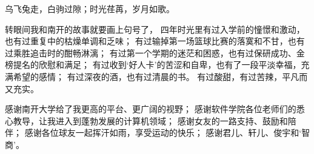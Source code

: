 
\begin{zhixie}
乌飞兔走，白驹过隙；时光荏苒，岁月如歌。

转眼间我和南开的故事就要画上句号了，
四年时光里有过入学前的憧憬和激动，也有过重复中的枯燥单调和乏味；
有过输掉第一场篮球比赛的落寞和不甘，也有过乘胜追击时的酣畅淋漓；
有过第一个学期的迷茫和困惑，也有过保研成功、金榜提名的欣慰和满足；
有过收到‘好人卡’的苦涩和自卑，也有了一段平淡幸福，充满希望的感情；
有过深夜的酒，也有过清晨的书。
有过酸甜，有过苦辣，平凡而又充实。

感谢南开大学给了我更高的平台、更广阔的视野；
感谢软件学院各位老师们的悉心教导，让我进入到蓬勃发展的计算机领域；
感谢女友的一路支持、鼓励和陪伴；
感谢各位球友一起挥汗如雨，享受运动的快乐；
感谢君儿、轩儿、俊宇和‘智商’。



\end{zhixie}